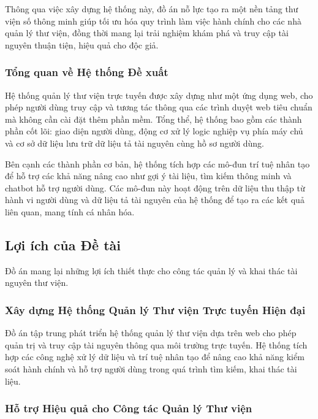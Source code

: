 Thông qua việc xây dựng hệ thống này, đồ án nỗ lực tạo ra một nền tảng thư viện số thông minh giúp tối ưu hóa quy trình làm việc hành chính cho các nhà quản lý thư viện, đồng thời mang lại trải nghiệm khám phá và truy cập tài nguyên thuận tiện, hiệu quả cho độc giả.

\subsubsection{Tổng quan về Hệ thống Đề xuất}

Hệ thống quản lý thư viện trực tuyến được xây dựng như một ứng dụng web, cho phép người dùng truy cập và tương tác thông qua các trình duyệt web tiêu chuẩn mà không cần cài đặt thêm phần mềm. Tổng thể, hệ thống bao gồm các thành phần cốt lõi: giao diện người dùng, động cơ xử lý logic nghiệp vụ phía máy chủ và cơ sở dữ liệu lưu trữ dữ liệu tả tài nguyên cùng hồ sơ người dùng.

Bên cạnh các thành phần cơ bản, hệ thống tích hợp các mô-đun trí tuệ nhân tạo để hỗ trợ các khả năng nâng cao như gợi ý tài liệu, tìm kiếm thông minh và chatbot hỗ trợ người dùng. Các mô-đun này hoạt động trên dữ liệu thu thập từ hành vi người dùng và dữ liệu tả tài nguyên của hệ thống để tạo ra các kết quả liên quan, mang tính cá nhân hóa.

\subsection{Lợi ích của Đề tài}

Đồ án mang lại những lợi ích thiết thực cho công tác quản lý và khai thác tài nguyên thư viện.

\subsubsection{Xây dựng Hệ thống Quản lý Thư viện Trực tuyến Hiện đại}

Đồ án tập trung phát triển hệ thống quản lý thư viện dựa trên web cho phép quản trị và truy cập tài nguyên thông qua môi trường trực tuyến. Hệ thống tích hợp các công nghệ xử lý dữ liệu và trí tuệ nhân tạo để nâng cao khả năng kiểm soát hành chính và hỗ trợ người dùng trong quá trình tìm kiếm, khai thác tài liệu.

\subsubsection{Hỗ trợ Hiệu quả cho Công tác Quản lý Thư viện}

